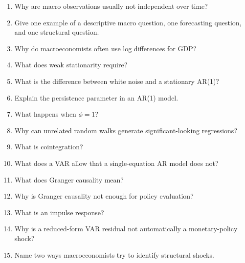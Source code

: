 \begin{enumerate}
    \item Why are macro observations usually not independent over time?
    \item Give one example of a descriptive macro question, one forecasting question, and one structural question.
    \item Why do macroeconomists often use log differences for GDP?
    \item What does weak stationarity require?
    \item What is the difference between white noise and a stationary AR(1)?
    \item Explain the persistence parameter in an AR(1) model.
    \item What happens when \(\phi=1\)?
    \item Why can unrelated random walks generate significant-looking regressions?
    \item What is cointegration?
    \item What does a VAR allow that a single-equation AR model does not?
    \item What does Granger causality mean?
    \item Why is Granger causality not enough for policy evaluation?
    \item What is an impulse response?
    \item Why is a reduced-form VAR residual not automatically a monetary-policy shock?
    \item Name two ways macroeconomists try to identify structural shocks.
\end{enumerate}


